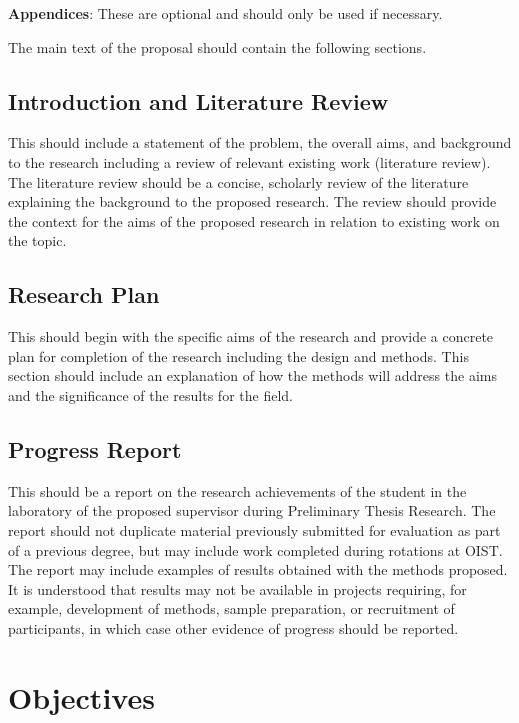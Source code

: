 \textbf{Appendices}: These are optional and should only be used if necessary.

The main text of the proposal should contain the following sections.

\section{Introduction and Literature Review}

This should include a statement of the problem, the overall aims, and background to the research including a review of relevant existing work (literature review). The literature review should be a concise, scholarly review of the literature explaining the background to the proposed research. The review should provide the context for the aims of the proposed research in relation to existing work on the topic.

\section{Research Plan}

 This should begin with the specific aims of the research and provide a concrete plan for completion of the research including the design and methods. This section should include an explanation of how the methods will address the aims and the significance of the results for the field.

\section{Progress Report}

This should be a report on the research achievements of the student in the laboratory of the proposed supervisor during Preliminary Thesis Research. The report should not duplicate material previously submitted for evaluation as part of a previous degree, but may include work completed during rotations at OIST. The report may include examples of results obtained with the methods proposed. It is understood that results may not be available in projects requiring, for example, development of methods, sample preparation, or recruitment of participants, in which case other evidence of progress should be reported.


\chapter{Objectives} \label{ch-2}

